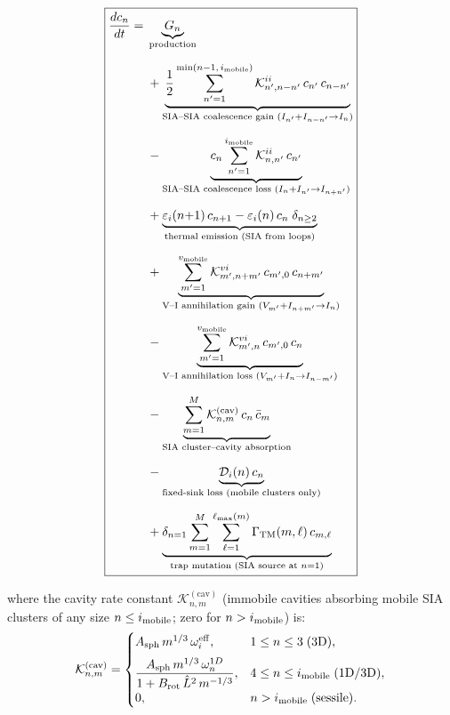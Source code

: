 \documentclass[pdflatex,sn-basic]{sn-jnl} %
\begin{document}
\clearpage
\begin{equation}\label{eq:ME_SIA}
\boxed{
\begin{split}
\frac{dc_n}{dt} = {} &
  \underbrace{G_n}_{\text{production}}
  \\[6pt]
  &+ \underbrace{
     \frac{1}{2}\sum_{n'=1}^{\min(n-1,\,i_{\rm mobile})}
     \mathcal{K}_{n',n-n'}^{ii}\,c_{n'}\,c_{n-n'}
     }_{\text{SIA--SIA coalescence gain } (I_{n'}+I_{n-n'}\to I_n)}
  \\[6pt]
  &- \underbrace{
     c_n\sum_{n'=1}^{i_{\rm mobile}}
     \mathcal{K}_{n,n'}^{ii}\,c_{n'}
     }_{\text{SIA--SIA coalescence loss } (I_n+I_{n'}\to I_{n+n'})}
  \\[6pt]
  &+ \underbrace{
     \varepsilon_i(n{+}1)\,c_{n+1}
   - \varepsilon_i(n)\,c_n\;\delta_{n \geq 2}
     }_{\text{thermal emission (SIA from loops)}}
  \\[6pt]
  &+ \underbrace{
     \sum_{m'=1}^{v_{\rm mobile}}
     \mathcal{K}_{m',n+m'}^{vi}\,c_{m',0}\,c_{n+m'}
     }_{\text{V--I annihilation gain } (V_{m'}+I_{n+m'}\to I_n)}
  \\[6pt]
  &- \underbrace{
     \sum_{m'=1}^{v_{\rm mobile}}
     \mathcal{K}_{m',n}^{vi}\,c_{m',0}\,c_n
     }_{\text{V--I annihilation loss } (V_{m'}+I_n\to I_{n-m'})}
  \\[6pt]
  &- \underbrace{
     \sum_{m=1}^{M}
     \mathcal{K}_{n,m}^{(\mathrm{cav})}\,c_n\,\bar{c}_m
     }_{\text{SIA cluster--cavity absorption}}
  \\[6pt]
  &- \underbrace{
     \mathcal{D}_i(n)\,c_n
     }_{\text{fixed-sink loss (mobile clusters only)}}
  \\[6pt]
  &+ \underbrace{
     \delta_{n=1}\sum_{m=1}^{M}\sum_{\ell=1}^{\ell_{\max}(m)}
     \Gamma_{\mathrm{TM}}(m,\ell)\,c_{m,\ell}
     }_{\text{trap mutation (SIA source at }n{=}1\text{)}}
\end{split}
}
\end{equation}

where the cavity rate constant $\mathcal{K}_{n,m}^{(\mathrm{cav})}$
(immobile cavities absorbing mobile SIA clusters of any size $n \leq
i_{\rm mobile}$; zero for $n > i_{\rm mobile}$) is:
\begin{equation}\label{eq:K_cav}
    \mathcal{K}_{n,m}^{(\mathrm{cav})} =
    \begin{cases}
        A_{\mathrm{sph}}\,m^{1/3}\,\omega_i^{\mathrm{eff}},
        & 1 \leq n \leq 3\;\text{(3D)}, \\[5pt]
        \displaystyle
        \frac{A_{\mathrm{sph}}\,m^{1/3}\,\omega_n^{1D}}
             {1 + B_{\mathrm{rot}}\,\hat{L}^2\,m^{-1/3}},
        & 4 \leq n \leq i_{\rm mobile}\;\text{(1D/3D)}, \\[5pt]
        0, & n > i_{\rm mobile}\;\text{(sessile)}.
    \end{cases}
\end{equation}
\end{document}
